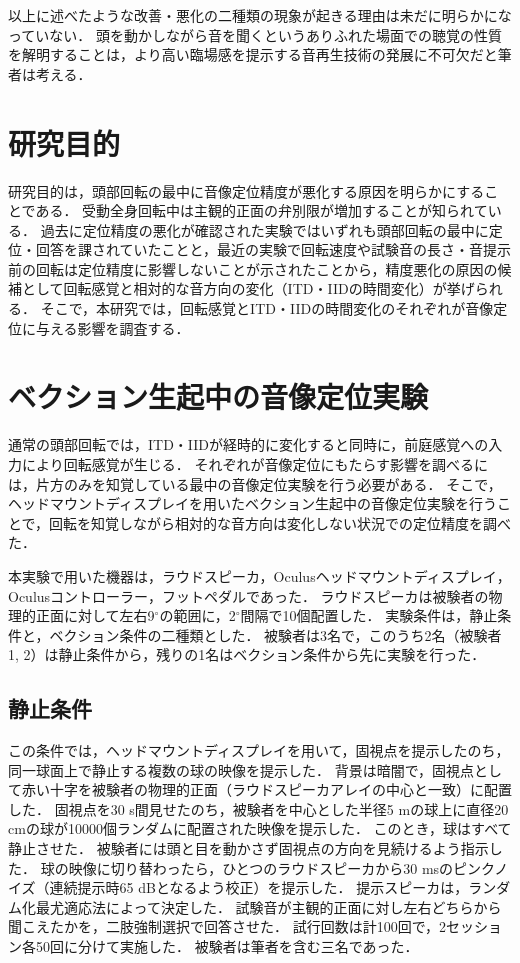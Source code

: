 \documentclass[12pt,a4j]{jsarticle}
\renewcommand{\ }{\hspace{1zw}}
\begin{document}
以上に述べたような改善・悪化の二種類の現象が起きる理由は未だに明らかになっていない．
頭を動かしながら音を聞くというありふれた場面での聴覚の性質を解明することは，より高い臨場感を提示する音再生技術の発展に不可欠だと筆者は考える．

\section{研究目的}
研究目的は，頭部回転の最中に音像定位精度が悪化する原因を明らかにすることである．
受動全身回転中は主観的正面の弁別限が増加することが知られている．
過去に定位精度の悪化が確認された実験ではいずれも頭部回転の最中に定位・回答を課されていたことと，最近の実験で回転速度や試験音の長さ・音提示前の回転は定位精度に影響しないことが示されたことから，精度悪化の原因の候補として回転感覚と相対的な音方向の変化（ITD・IIDの時間変化）が挙げられる．
そこで，本研究では，回転感覚とITD・IIDの時間変化のそれぞれが音像定位に与える影響を調査する．

\section{ベクション生起中の音像定位実験}
通常の頭部回転では，ITD・IIDが経時的に変化すると同時に，前庭感覚への入力により回転感覚が生じる．
それぞれが音像定位にもたらす影響を調べるには，片方のみを知覚している最中の音像定位実験を行う必要がある．
そこで，ヘッドマウントディスプレイを用いたベクション生起中の音像定位実験を行うことで，回転を知覚しながら相対的な音方向は変化しない状況での定位精度を調べた．

本実験で用いた機器は，ラウドスピーカ，Oculusヘッドマウントディスプレイ，Oculusコントローラー，フットペダルであった．
ラウドスピーカは被験者の物理的正面に対して左右9$^\circ$の範囲に，2$^\circ$間隔で10個配置した．
実験条件は，静止条件と，ベクション条件の二種類とした．
被験者は3名で，このうち2名（被験者1, 2）は静止条件から，残りの1名はベクション条件から先に実験を行った．

\subsection{静止条件}
この条件では，ヘッドマウントディスプレイを用いて，固視点を提示したのち，同一球面上で静止する複数の球の映像を提示した．
背景は暗闇で，固視点として赤い十字を被験者の物理的正面（ラウドスピーカアレイの中心と一致）に配置した．
固視点を30 s間見せたのち，被験者を中心とした半径5 mの球上に直径20 cmの球が10000個ランダムに配置された映像を提示した．
このとき，球はすべて静止させた．
被験者には頭と目を動かさず固視点の方向を見続けるよう指示した．
球の映像に切り替わったら，ひとつのラウドスピーカから30 msのピンクノイズ（連続提示時65 dBとなるよう校正）を提示した．
提示スピーカは，ランダム化最尤適応法によって決定した．
試験音が主観的正面に対し左右どちらから聞こえたかを，二肢強制選択で回答させた．
試行回数は計100回で，2セッション各50回に分けて実施した．
被験者は筆者を含む三名であった．
\end{document}
